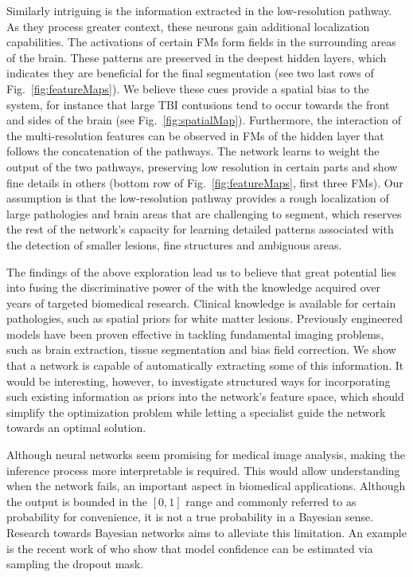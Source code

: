 Similarly intriguing is the information extracted in the low-resolution pathway. As they process greater context, these neurons gain additional localization capabilities. The activations of certain FMs form fields in the surrounding areas of the brain. These patterns are preserved in the deepest hidden layers, which indicates they are beneficial for the final segmentation (see two last rows of Fig.~\ref{fig:featureMaps}). We believe these cues provide a spatial bias to the system, for instance that large TBI contusions tend to occur towards the front and sides of the brain (see Fig.~\ref{fig:spatialMap}). Furthermore, the interaction of the multi-resolution features can be observed in FMs of the hidden layer that follows the concatenation of the pathways. The network learns to weight the output of the two pathways, preserving low resolution in certain parts and show fine details in others (bottom row of Fig.~\ref{fig:featureMaps}, first three FMs). Our assumption is that the low-resolution pathway provides a rough localization of large pathologies and brain areas that are challenging to segment, which reserves the rest of the network's capacity for learning detailed patterns associated with the detection of smaller lesions, fine structures and ambiguous areas.

The findings of the above exploration lead us to believe that great potential lies into fusing the discriminative power of the  with the knowledge acquired over years of targeted biomedical research. Clinical knowledge is available for certain pathologies, such as spatial priors for white matter lesions. Previously engineered models have been proven effective in tackling fundamental imaging problems, such as brain extraction, tissue segmentation and bias field correction. We show that a network is capable of automatically extracting some of this information. It would be interesting, however, to investigate structured ways for incorporating such existing information as priors into the network's feature space, which should simplify the optimization problem while letting a specialist guide the network towards an optimal solution.

Although neural networks seem promising for medical image analysis, making the inference process more interpretable is required. This would allow understanding when the network fails, an important aspect in biomedical applications. Although the output is bounded in the $[0,1]$ range and commonly referred to as probability for convenience, it is not a true probability in a Bayesian sense. Research towards Bayesian networks aims to alleviate this limitation. An example is the recent work of \cite{Gal2015} who show that model confidence can be estimated via sampling the dropout mask.

